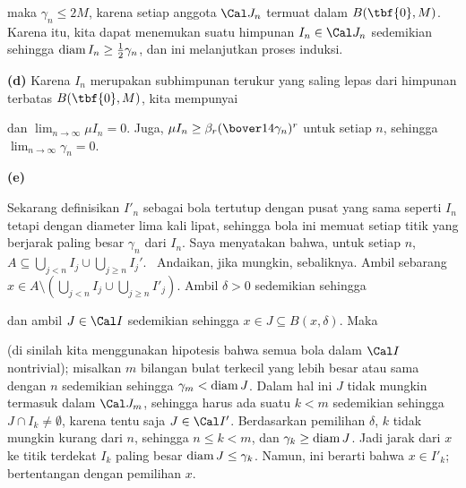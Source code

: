 {\noindent maka $\gamma_n\le 2M$, karena setiap anggota $\Cal J_n$ termuat 
dalam $B(\tbf{0},M)$. Karena itu, kita dapat menemukan suatu himpunan 
$I_n\in\Cal J_n$ sedemikian sehingga $\mathop{\text{diam}} I_n\ge{1\over 2}\gamma_n$, dan 
ini melanjutkan proses induksi. 
      
\medskip 
      
{\bf (d)} Karena $I_n$ merupakan subhimpunan terukur yang saling lepas dari 
himpunan terbatas $B(\tbf{0},M)$, kita mempunyai 
      
      
\noindent dan $\lim_{n\to\infty}\mu I_n=0$. Juga, 
$\mu I_n\ge\beta_r(\bover14\gamma_n)^r$ untuk setiap $n$, sehingga 
$\lim_{n\to\infty}\gamma_n=0$. 
      
\medskip

{\bf (e)}

Sekarang definisikan $I'_n$ sebagai bola tertutup dengan pusat yang sama 
seperti $I_n$ tetapi dengan diameter lima kali lipat, sehingga bola ini 
memuat setiap titik yang berjarak paling besar $\gamma_n$ dari $I_n$. Saya 
menyatakan bahwa, untuk setiap $n$, 
$A\subseteq\bigcup_{j<n}{I}_j\cup\bigcup_{j\ge n}I_j'$. 
\Prf\Quer\ Andaikan, jika mungkin, sebaliknya. Ambil sebarang 
$x\in A\setminus(\bigcup_{j<n}{I}_j\cup\bigcup_{j\ge n}I'_j)$. Ambil 
$\delta>0$ sedemikian sehingga 
      
      
      
\noindent dan ambil $J\in\Cal I$ sedemikian sehingga 
$x\in J\subseteq B(x,\delta)$. Maka 
      
      
\noindent (di sinilah kita menggunakan hipotesis bahwa semua bola dalam 
$\Cal I$ nontrivial); misalkan $m$ bilangan bulat terkecil yang lebih besar 
atau sama dengan $n$ sedemikian sehingga $\gamma_m<\mathop{\text{diam}} J$. Dalam hal ini 
$J$ tidak mungkin termasuk dalam $\Cal J_m$, sehingga harus ada suatu $k<m$ 
sedemikian sehingga $J\cap I_k\ne\emptyset$, karena tentu saja 
$J\in\Cal I'$. Berdasarkan pemilihan $\delta$, $k$ tidak mungkin kurang dari 
$n$, sehingga $n\le k<m$, dan $\gamma_k\ge\mathop{\text{diam}} J$. Jadi jarak dari $x$ ke 
titik terdekat $I_k$ paling besar $\mathop{\text{diam}} J\le \gamma_k$. Namun, ini berarti 
bahwa $x\in I'_k$; bertentangan dengan pemilihan $x$.\ \Bang\Qed 
      
\medskip 
      
}
